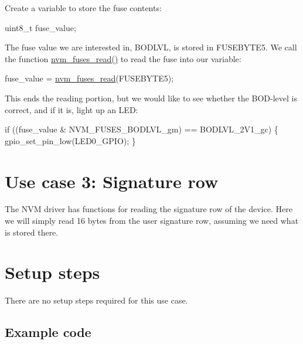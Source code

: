 \begin{DoxyEnumerate}
\item Create a variable to store the fuse contents\-:
\begin{DoxyItemize}
\item 
\begin{DoxyCode}
        uint8\_t fuse\_value;
\end{DoxyCode}

\end{DoxyItemize}
\item The fuse value we are interested in, B\-O\-D\-L\-V\-L, is stored in F\-U\-S\-E\-B\-Y\-T\-E5. We call the function \hyperlink{group__nvm__fuse__lock__group_ga7f38ae8b811b4b6c7a209e37cfe1b03d}{nvm\-\_\-fuses\-\_\-read()} to read the fuse into our variable\-:
\begin{DoxyItemize}
\item 
\begin{DoxyCode}
        fuse\_value = \hyperlink{group__nvm__fuse__lock__group_ga7f38ae8b811b4b6c7a209e37cfe1b03d}{nvm\_fuses\_read}(FUSEBYTE5);
\end{DoxyCode}

\end{DoxyItemize}
\item This ends the reading portion, but we would like to see whether the B\-O\-D-\/level is correct, and if it is, light up an L\-E\-D\-:
\begin{DoxyItemize}
\item 
\begin{DoxyCode}
        \textcolor{keywordflow}{if} ((fuse\_value & NVM\_FUSES\_BODLVL\_gm) == BODLVL\_2V1\_gc) \{
            gpio\_set\_pin\_low(LED0\_GPIO);
        \}
\end{DoxyCode}

\end{DoxyItemize}
\end{DoxyEnumerate}\hypertarget{xmega_nvm_quickstart_xmega_nvm_quickstart_signature_case}{}\section{Use case 3\-: Signature row}\label{xmega_nvm_quickstart_xmega_nvm_quickstart_signature_case}
The N\-V\-M driver has functions for reading the signature row of the device. Here we will simply read 16 bytes from the user signature row, assuming we need what is stored there.\hypertarget{xmega_nvm_quickstart_xmega_nvm_quickstart_signature_row_setup_steps}{}\section{Setup steps}\label{xmega_nvm_quickstart_xmega_nvm_quickstart_signature_row_setup_steps}
There are no setup steps required for this use case.\hypertarget{xmega_nvm_quickstart_xmega_nvm_quickstart_signature_row_example_code}{}\subsection{Example code}\label{xmega_nvm_quickstart_xmega_nvm_quickstart_signature_row_example_code}


